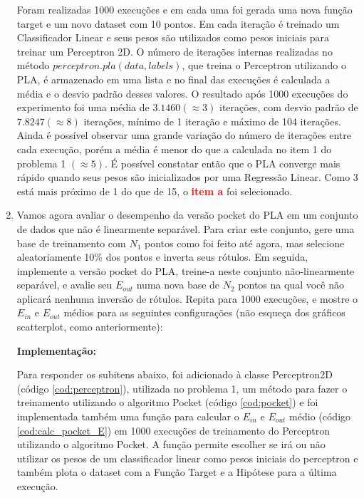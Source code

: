 \begin{enumerate}
    Foram realizadas 1000 execuções e em cada uma foi gerada uma nova função target e um novo dataset com 10 pontos. Em cada iteração é treinado um Classificador Linear e seus pesos são utilizados como pesos iniciais para treinar um Perceptron 2D. O número de iterações internas realizadas no método $perceptron.pla(data,labels)$, que treina o Perceptron utilizando o PLA, é armazenado em uma lista e no final das execuções é calculada a média e o desvio padrão desses valores. O resultado após 1000 execuções do experimento foi uma média de $3.1460(\approx 3)$ iterações, com desvio padrão de $7.8247(\approx 8)$ iterações, mínimo de 1 iteração e máximo de 104 iterações. Ainda é possível observar uma grande variação do número de iterações entre cada execução, porém a média é menor do que a calculada no item 1 do problema 1 $(\approx 5)$. É possível constatar então que o PLA converge mais rápido quando seus pesos são inicializados por uma Regressão Linear. Como 3 está mais próximo de 1 do que de 15, o \textcolor{red}{\textbf{item a}} foi selecionado. 
    
    \item Vamos agora avaliar o desempenho da versão pocket do PLA em um conjunto de dados que não é linearmente separável. Para criar este conjunto, gere uma base de treinamento com $N_1$ pontos como foi feito até agora, mas selecione aleatoriamente 10\% dos pontos e inverta seus rótulos. Em seguida, implemente a versão pocket do PLA, treine-a neste conjunto não-linearmente separável, e avalie seu $E_{out}$ numa nova base de $N_2$ pontos na qual você não aplicará nenhuma inversão de rótulos. Repita para 1000 execuções, e mostre o $E_{in}$ e $E_{out}$ médios para as seguintes configurações (não esqueça dos gráficos scatterplot, como anteriormente):
    
    \par

    \textbf{Implementação:}
    
    Para responder os subitens abaixo, foi adicionado à classe Perceptron2D (código \ref{cod:perceptron}), utilizada no problema 1, um método para fazer o treinamento utilizando o algoritmo Pocket (código \ref{cod:pocket}) e foi implementada também uma função para calcular o $E_{in}$ e $E_{out}$ médio (código \ref{cod:calc_pocket_E}) em 1000 execuções de treinamento do Perceptron utilizando o algoritmo Pocket. A função permite escolher se irá ou não utilizar os pesos de um classificador linear como pesos iniciais do perceptron e também plota o dataset com a Função Target e a Hipótese para a última execução.


\end{enumerate}
